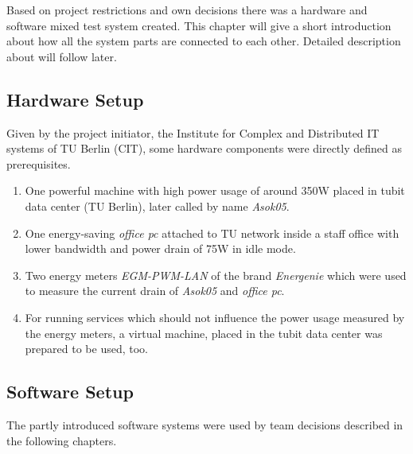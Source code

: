 Based on project restrictions and own decisions there was a hardware and software mixed test system created. This chapter will give a short introduction about how all the system parts are connected to each other. Detailed description about will follow later.

\subsection{Hardware Setup}

Given by the project initiator, the Institute for Complex and Distributed IT systems of TU Berlin (CIT), some hardware components were directly defined as prerequisites.

\begin{enumerate}

\item One powerful machine with high power usage of around 350W placed in tubit data center (TU Berlin), later called by name \textit{Asok05}.

\item One energy-saving \textit{office pc} attached to TU network inside a staff office with lower bandwidth and power drain of 75W in idle mode.

\item Two energy meters \textit{EGM-PWM-LAN} of the brand \textit{Energenie} which were used to measure the current drain of \textit{Asok05} and \textit{office pc}.

\item For running services which should not influence the power usage measured by the energy meters, a virtual machine, placed in the tubit data center was prepared to be used, too.

\end{enumerate}


\subsection{Software Setup}

The partly introduced software systems were used by team decisions described in the following chapters.

